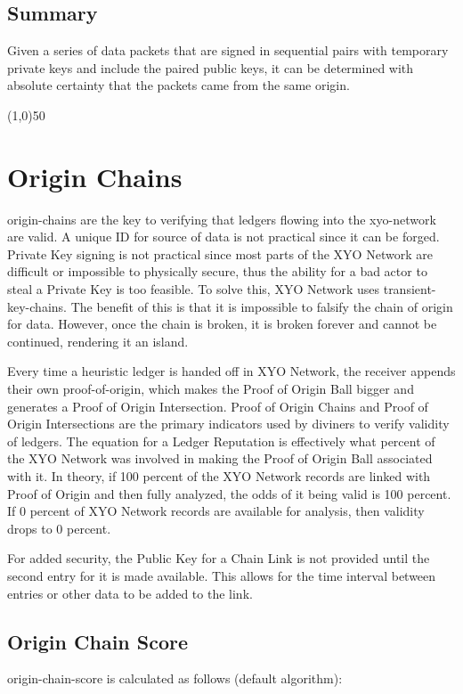\documentclass{article}
\begin{document}
\subsection {Summary}
Given a series of data packets that are signed in sequential pairs with temporary private keys and include the paired public keys, it can be determined with absolute \gls{certainty} that the packets came from the same origin.
\begin{center}
\line(1,0){50}
\end{center}

\section {Origin Chains}
\Glspl{origin-chain} are the key to verifying that ledgers flowing into the \Gls{xyo-network} are valid. A unique ID for source of data is not practical since it can be forged. Private Key signing is not practical since most parts of the XYO Network are difficult or impossible to physically secure, thus the ability for a bad actor to steal a Private Key is too feasible. To solve this, XYO Network uses \Glspl{transient-key-chain}. The benefit of this is that it is impossible to falsify the chain of origin for data. However, once the chain is broken, it is broken forever and cannot be continued, rendering it an island. 

Every time a \gls{heuristic} ledger is handed off in XYO Network, the receiver appends their own \Gls{proof-of-origin}, which makes the Proof of Origin Ball bigger and generates a Proof of Origin Intersection. Proof of Origin Chains and Proof of Origin Intersections are the primary indicators used by \Glspl{diviner} to verify validity of ledgers. The equation for a Ledger Reputation is effectively what percent of the XYO Network was involved in making the Proof of Origin Ball associated with it. In theory, if 100 percent of the XYO Network records are linked with Proof of Origin and then fully analyzed, the odds of it being valid is 100 percent. If 0 percent of XYO Network records are available for analysis, then validity drops to 0 percent.

For added security, the Public Key for a Chain Link is not provided until the second entry for it is made available. This allows for the time interval between entries or other data to be added to the link.

\subsection {Origin Chain Score}
\Gls{origin-chain-score} is calculated as follows (default algorithm):
\end{document}
